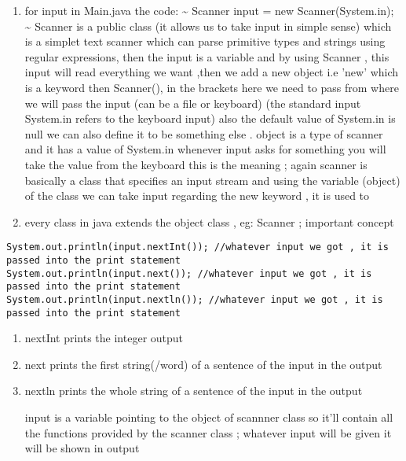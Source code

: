 \documentclass[11pt]{article}
\begin{document}
\begin{enumerate}
\item for input in Main.java the code: \textasciitilde{} Scanner input = new Scanner(System.in); \textasciitilde{}  Scanner is a public class (it allows us to take input in simple sense) which is a simplet text scanner which can parse primitive types and strings using regular expressions, then the input is a variable and by using Scanner , this input will read everything we want ,then we add a new object i.e 'new' which is a keyword then Scanner(), in the brackets here we need to pass from where we will pass the input (can be a file or keyboard) (the standard input System.in refers to the keyboard input) also the default value of System.in is null we can also define it to be something else . object is a type of scanner and it has a value of System.in whenever input asks for something you will take the value from the keyboard this is the meaning ; again scanner is basically a class that specifies an input stream and using the variable (object) of the class we can take input
regarding the new keyword , it is used to

\item every class in java extends the object class , eg: Scanner ; important concept
\end{enumerate}

\begin{verbatim}
System.out.println(input.nextInt()); //whatever input we got , it is passed into the print statement
System.out.println(input.next()); //whatever input we got , it is passed into the print statement
System.out.println(input.nextln()); //whatever input we got , it is passed into the print statement
\end{verbatim}

\begin{enumerate}
\item nextInt prints the integer output
\item next prints the first string(/word) of a sentence of the input in the output
\item nextln prints the whole string of a sentence of the input in the output

input is a variable pointing to the object of scannner class so it'll contain all the functions provided by the scanner class ; whatever input will be given it will be shown in output
\end{enumerate}
\end{document}
